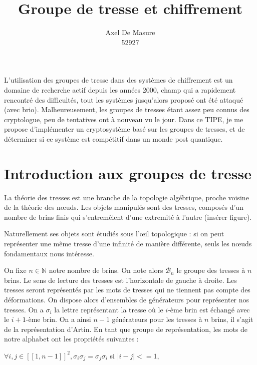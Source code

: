 \documentclass[a4paper,100pt]{article}
\begin{document}
\title{\textbf{Groupe de tresse et chiffrement}}
\author{Axel De Masure\\ 52927}

\newcommand{\Bn}{\mathcal{B}_n}
\newcommand{\LBn}{\mathcal{LB}_n}
\newcommand{\UBn}{\mathcal{UB}_n}

\date{}
\maketitle
\graphicspath{ {./} }

L'utilisation des groupes de tresse dans des systèmes de chiffrement est un domaine de recherche actif depuis les années 2000, champ qui a rapidement rencontré des difficultés, tout les systèmes jusqu'alors proposé ont été attaqué (avec brio). Malheureusement, les groupes de tresses étant assez peu connus des cryptologue, peu de tentatives ont à nouveau vu le jour. Dans ce TIPE, je me propose d'implémenter un cryptosystème basé sur les groupes de tresses, et de déterminer si ce système est compétitif dans un monde post quantique.

\section{Introduction aux groupes de tresse}
La théorie des tresses est une branche de la topologie algébrique, proche voisine de la théorie des nœuds. Les objets manipulés sont des tresses, composés d'un nombre de brins finis qui s'entremêlent d'une extremité à l'autre (insérer figure).


Naturellement ses objets sont étudiés sous l'œil topologique : si on peut représenter une même tresse d'une infinité de manière différente, seuls les nœuds fondamentaux nous intéresse.

On fixe $ n \in \mathbb{N} $ notre nombre de brins. On note alors $\Bn$ le groupe des tresses à $n$ brins. Le sens de lecture des tresses est l'horizontale de gauche à droite. Les tresses seront représentés par les mots de tresses qui ne tiennent pas compte des déformations. On dispose alors d'ensembles de générateurs pour représenter nos tresses. On a $\sigma_i$ la lettre représentant la tresse où le $i$-ème brin est échangé avec le $i+1$-ème brin. On a ainsi $n-1$ générateurs pour les tresses à $n$ brins, il s'agit de la représentation d'Artin.
En tant que groupe de représentation, les mots de notre alphabet ont les propriétés suivantes :

$\forall i,j \in [\![ 1,n-1]\!] ^2, \sigma_i\sigma_j = \sigma_j\sigma_i$ si $|i-j| <= 1$,
\end{document}
